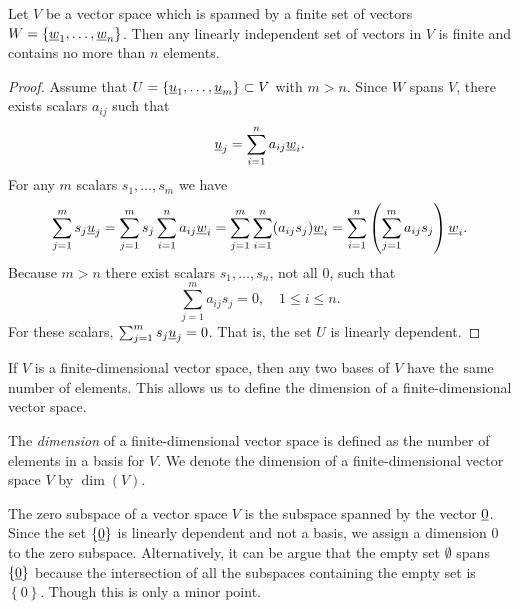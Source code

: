 \begin{theorem}
Let $V$ be a vector space which is spanned by a finite set of vectors $W = \left\{ \underline{w}_1, \ldots, \underline{w}_n \right\}$.
Then any linearly independent set of vectors in $V$ is finite and contains no more than $n$ elements.
\end{theorem}
\begin{proof}
Assume that $U = \left\{ \underline{u}_1, \ldots, \underline{u}_m \right\} \subset V$ with $m > n$.
Since $W$ spans $V$, there exists scalars $a_{ij}$ such that
\begin{equation*}
\underline{u}_j = \sum_{i=1}^n a_{ij} \underline{w}_i.
\end{equation*}
For any $m$ scalars $s_1, \ldots, s_m$ we have
\begin{equation*}
\sum_{j=1}^m s_j \underline{u}_j
= \sum_{j=1}^m s_j \sum_{i=1}^n a_{ij} \underline{w}_i
= \sum_{j=1}^m \sum_{i=1}^n ( a_{ij} s_j ) \underline{w}_i
= \sum_{i=1}^n \left( \sum_{j=1}^m a_{ij} s_j \right) \underline{w}_i . 
\end{equation*}
Because $m > n$ there exist scalars $s_1, \ldots, s_n$, not all $0$, such that
\begin{equation*}
\sum_{j=1}^m a_{ij} s_j = 0, \quad 1 \leq i \leq n. 
\end{equation*}
For these scalars, $\sum_{j=1}^m s_j \underline{u}_j = 0$.
That is, the set $U$ is linearly dependent.
\end{proof}

If $V$ is a finite-dimensional vector space, then any two bases of $V$ have the same number of elements.
This allows us to define the dimension of a finite-dimensional vector space.

\begin{definition}
The \emph{dimension} of a finite-dimensional vector space is defined as the number of elements in a basis for $V$.
We denote the dimension of a finite-dimensional vector space $V$ by $\dim(V)$.
\end{definition}

The zero subspace of a vector space $V$ is the subspace spanned by the vector $\underline{0}$.
Since the set $\left\{ \underline{0} \right\}$ is linearly dependent and not a basis, we assign a dimension $0$ to the zero subspace.
Alternatively, it can be argue that the empty set $\emptyset$ spans $\left\{ \underline{0} \right\}$ because the intersection of all the subspaces containing the empty set is $\left\{ 0 \right\}$.
Though this is only a minor point.

